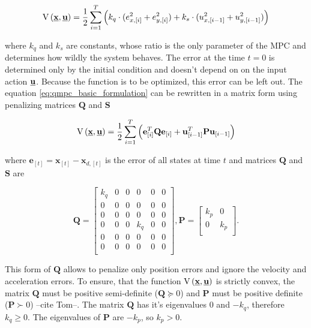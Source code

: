 \documentclass{article}
\begin{document}
\begin{equation}
\label{eq:qmpc_basic_formulation}
\mathrm{V}\left(\textbf{\underline{x}}, \textbf{\underline{u}}\right) 
= \frac{1}{2}\sum_{i=1}^{T}\left( k_q \cdot (e^2_{x, [i]}+e^2_{y, [i]}) + k_s \cdot (u^2_{x, [i-1]}+u^2_{y, [i-1]})\right)
\end{equation}

where $k_q$ and $k_s$ are constants, whose ratio is the only parameter of the MPC and determines how wildly the system behaves. The error at the time $t = 0$ is determined only by the initial condition and doesn't depend on on the input action $\textbf{\underline{u}}$. Because the function is to be optimized, this error can be left out. The equation \ref{eq:qmpc_basic_formulation} can be rewritten in a matrix form using penalizing matrices $\textbf{Q}$ and $\textbf{S}$

\begin{equation}
\label{eq:qmpc_basic_formulation2}
\mathrm{V}\left(\textbf{\underline{x}}, \textbf{\underline{u}}\right) = \frac{1}{2}\sum_{i=1}^{T}\left(\textbf{e}^T_{[i]}\textbf{Q}\textbf{e}_{[i]} + \textbf{u}^T_{[i-1]}\textbf{P}\textbf{u}_{[i-1]}\right)
\end{equation}

where $\textbf{e}_{[t]} = \textbf{x}_{[t]} - \textbf{x}_{d,[t]}$ is the error of all states at time $t$  and matrices $\textbf{Q}$ and $\textbf{S}$ are

\begin{equation}
\label{eq:qmpc_weighting_matrices_simple}
\textbf{Q} = \begin{bmatrix}
k_q & 0 & 0 & 0 & 0 & 0 \\
0 & 0 & 0 & 0 & 0 & 0 \\
0 & 0 & 0 & 0 & 0 & 0 \\
0 & 0 & 0 & k_q & 0 & 0 \\
0 & 0 & 0 & 0 & 0 & 0 \\
0 & 0 & 0 & 0 & 0 & 0 \\
\end{bmatrix}, 
\textbf{P} = \begin{bmatrix}
k_p & 0\\
0 & k_p\\
\end{bmatrix}.
\end{equation}

This form of $\textbf{Q}$ allows to penalize only position errors and ignore the velocity and acceleration errors. To ensure, that the function $\mathrm{V}\left(\textbf{\underline{x}}, \textbf{\underline{u}}\right)$ is strictly convex, the matrix $\textbf{Q}$ must be positive semi-definite ($\textbf{Q} \succeq 0$) and $\textbf{P}$ must be positive definite ($\textbf{P} \succ 0$) --cite Tom--. The matrix $\textbf{Q}$ has it's eigenvalues $0$ and $-k_q$, therefore $k_q \geq 0$. The eigenvalues of $\textbf{P}$ are $-k_p$, so $k_p > 0$.
\end{document}

